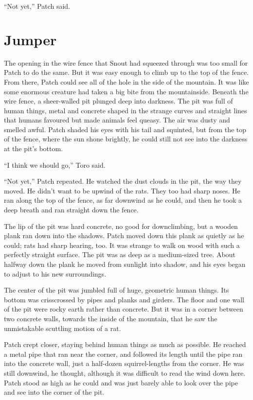 \documentclass[ebook,oneside,openany,12pt]{memoir}
\begin{document}
“Not yet,” Patch said.


\section{Jumper}

The opening in the wire fence that Snout had squeezed through was too
small for Patch to do the same. But it was easy enough to climb up to
the top of the fence. From there, Patch could see all of the hole in
the side of the mountain. It was like some enormous creature had taken
a big bite from the mountainside. Beneath the wire fence, a
sheer-walled pit plunged deep into darkness. The pit was full of human
things, metal and concrete shaped in the strange curves and straight
lines that humans favoured but made animals feel queasy. The air was
dusty and smelled awful. Patch shaded his eyes with his tail and
squinted, but from the top of the fence, where the sun shone brightly,
he could still not see into the darkness at the pit’s bottom.

“I think we should go,” Toro said.

“Not yet,” Patch repeated. He watched the dust clouds in the pit, the
way they moved. He didn’t want to be upwind of the rats. They too had
sharp noses. He ran along the top of the fence, as far downwind as he
could, and then he took a deep breath and ran straight down the fence.

The lip of the pit was hard concrete, no good for downclimbing, but a
wooden plank ran down into the shadows. Patch moved down this plank as
quietly as he could; rats had sharp hearing, too. It was strange to
walk on wood with such a perfectly straight surface. The pit was as
deep as a medium-sized tree. About halfway down the plank he moved
from sunlight into shadow, and his eyes began to adjust to his new
surroundings.

The center of the pit was jumbled full of huge, geometric human
things. Its bottom was crisscrossed by pipes and planks and
girders. The floor and one wall of the pit were rocky earth rather
than concrete. But it was in a corner between two concrete walls,
towards the inside of the mountain, that he saw the unmistakable
scuttling motion of a rat.

Patch crept closer, staying behind human things as much as
possible. He reached a metal pipe that ran near the corner, and
followed its length until the pipe ran into the concrete wall, just a
half-dozen squirrel-lengths from the corner. He was still downwind, he
thought, although it was difficult to read the wind down here. Patch
stood as high as he could and was just barely able to look over the
pipe and see into the corner of the pit.
\end{document}
